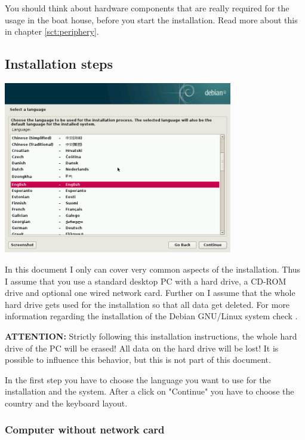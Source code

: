 \documentclass[a4paper,12pt,twoside]{article}
\begin{document}
You should think about hardware components that are really required for
the usage in the boat house, before you start the installation. Read
more about this in chapter \ref{sct:periphery}.


\subsection{Installation steps}
\label{sct:inst_steps}

\begin{minipage}{\linewidth}
    \centering
    \captionsetup{type=figure}
    \includegraphics[width=10cm]{screenshots/select_language.png}
    \label{fig:inst_language}
\end{minipage}
\bigskip

In this document I only can cover very common aspects of the
installation. Thus I assume that you use a standard desktop PC with a
hard drive, a CD-ROM drive and optional one wired network card. Further
on I assume that the whole hard drive gets used for the installation so
that all data get deleted. For more information regarding the
installation of the Debian GNU/Linux system check \cite{DEB2}.

\textbf{ATTENTION:} Strictly following this installation instructions, the whole
hard drive of the PC will be erased! All data on the hard drive will be
lost! It is possible to influence this behavior, but this is not part
of this document.

In the first step you have to choose the language you want to use for
the installation and the system. After a click on
"Continue" you have to choose the country
and the keyboard layout.


\subsubsection{Computer without network card}
\label{sct:inst_no_net}
\end{document}
